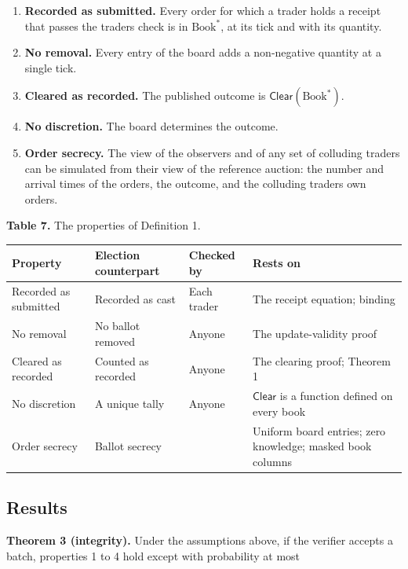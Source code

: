 \begin{enumerate}
\def\labelenumi{\arabic{enumi}.}
\item
  \textbf{Recorded as submitted.} Every order for which a trader holds a receipt that passes the trader\textquotesingle s check is in \(\text{Book}^*\), at its tick and with its quantity.
\item
  \textbf{No removal.} Every entry of the board adds a non-negative quantity at a single tick.
\item
  \textbf{Cleared as recorded.} The published outcome is \(\mathsf{Clear}(\text{Book}^*)\).
\item
  \textbf{No discretion.} The board determines the outcome.
\item
  \textbf{Order secrecy.} The view of the observers and of any set of colluding traders can be simulated from their view of the reference auction: the number and arrival times of the orders, the outcome, and the colluding traders\textquotesingle{} own orders.
\end{enumerate}

\textbf{Table 7.} The properties of Definition 1.

\begin{longtable}[]{@{}llll@{}}
\toprule\noalign{}
Property & Election counterpart \cite{zeeperio2026} & Checked by & Rests on \\
\midrule\noalign{}
\endhead
\bottomrule\noalign{}
\endlastfoot
Recorded as submitted & Recorded as cast & Each trader & The receipt equation; binding \\
No removal & No ballot removed & Anyone & The update-validity proof \\
Cleared as recorded & Counted as recorded & Anyone & The clearing proof; Theorem 1 \\
No discretion & A unique tally & Anyone & \(\mathsf{Clear}\) is a function defined on every book \\
Order secrecy & Ballot secrecy & & Uniform board entries; zero knowledge; masked book columns \\
\end{longtable}

\subsection{Results}

\textbf{Theorem 3 (integrity).} Under the assumptions above, if the verifier accepts a batch, properties 1 to 4 hold except with probability at most

